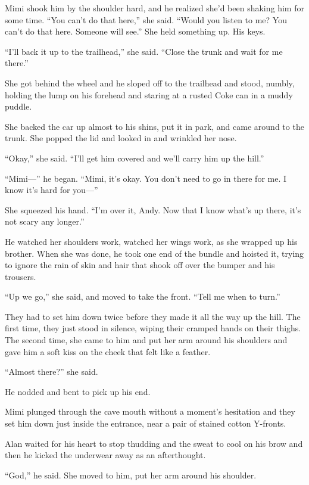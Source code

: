 Mimi shook him by the shoulder hard, and he realized she'd been
shaking him for some time.  ``You can't do that here,'' she said. 
``Would you listen to me?  You can't do that here.  Someone will
see.'' She held something up.  His keys.

``I'll back it up to the trailhead,'' she said.  ``Close the trunk and
wait for me there.''

She got behind the wheel and he sloped off to the trailhead and stood,
numbly, holding the lump on his forehead and staring at a rusted Coke
can in a muddy puddle.

She backed the car up almost to his shins, put it in park, and came
around to the trunk.  She popped the lid and looked in and wrinkled
her nose.

``Okay,'' she said.  ``I'll get him covered and we'll carry him up the
hill.''

``Mimi---'' he began.  ``Mimi, it's okay.  You don't need to go in
there for me.  I know it's hard for you---''

She squeezed his hand.  ``I'm over it, Andy.  Now that I know what's
up there, it's not scary any longer.''

He watched her shoulders work, watched her wings work, as she wrapped
up his brother.  When she was done, he took one end of the bundle and
hoisted it, trying to ignore the rain of skin and hair that shook off
over the bumper and his trousers.

``Up we go,'' she said, and moved to take the front.  ``Tell me when
to turn.''

They had to set him down twice before they made it all the way up the
hill.  The first time, they just stood in silence, wiping their
cramped hands on their thighs.  The second time, she came to him and
put her arm around his shoulders and gave him a soft kiss on the cheek
that felt like a feather.

``Almost there?'' she said.

He nodded and bent to pick up his end.

Mimi plunged through the cave mouth without a moment's hesitation and
they set him down just inside the entrance, near a pair of stained
cotton Y-fronts.

Alan waited for his heart to stop thudding and the sweat to cool on
his brow and then he kicked the underwear away as an afterthought.

``God,'' he said.  She moved to him, put her arm around his shoulder.


